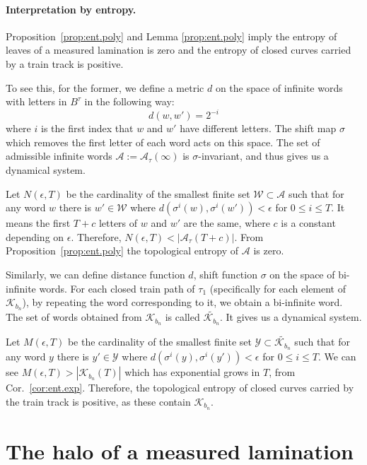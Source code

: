 \documentclass[11pt]{article} %
\theoremstyle{plain}
\theoremstyle{definition}
\numberwithin{equation}{section}
\begin{document}
\paragraph{Interpretation by entropy.}
Proposition~\ref{prop:ent.poly} and Lemma \ref{prop:ent.poly} imply the entropy of leaves of a measured lamination is zero and the entropy of closed curves carried by a train track is positive.
 
To see this, for the former, we define a metric $d$ on the space of infinite words with letters in $B^\tau$ in the following way:
$$
d(w, w')=2^{-i}
$$
where $i$ is the first index that $w$ and $w'$ have different letters. The shift map $\sigma$ which removes the first letter of each word acts on this space. The set of admissible infinite words $\mathcal{A}:=\mathcal{A}_{\tau}(\infty)$ is $\sigma$-invariant, and thus gives us a dynamical system.
 
 Let $N(\epsilon, T)$ be the cardinality of the smallest finite set $\mathcal{W}\subset\mathcal{A}$ such that for any word $w$ there is $w' \in \mathcal{W}$ where $d(\sigma^i(w),\sigma^i(w'))< \epsilon$ for $0\leq i \leq T$. It means the first $T+c$ letters of $w$ and $w'$ are the same, where $c$ is a constant depending on $\epsilon$. Therefore, $N(\epsilon, T)<|\mathcal{A}_{\tau}(T+c)|$. 
 From Proposition~\ref{prop:ent.poly} the topological entropy of $\mathcal{A}$ is zero.
 
 Similarly, we can define distance function $d$, shift function $\sigma$ on the space of bi-infinite words.
 For each closed train path of $\tau_1$ (specifically for each element of $\mathcal{K}_{b_n}$), by repeating the word corresponding to it, we obtain a bi-infinite word. The set of words obtained from $\mathcal{K}_{b_n}$ is called $\widetilde{\mathcal{K}_{b_n}}$. It gives us a dynamical system.
 
 Let $M(\epsilon, T)$ be the cardinality of the smallest finite set $\mathcal{Y}\subset \widetilde{\mathcal{K}_{b_n}}$ such that for any word $y$ there is $y' \in \mathcal{Y}$ where $d(\sigma^i(y),\sigma^i(y'))< \epsilon$ for $0\leq i \leq T$. We can see $M(\epsilon, T)> |\mathcal{K}_{b_n}(T)|$ which has exponential grows in $T$, from Cor.\ \ref{cor:ent.exp}. Therefore, the topological entropy of closed curves carried by the train track is positive, as these contain $\mathcal{K}_{b_n}$.

\section{The halo of a measured lamination}\label{sec:general_proof}
\end{document}
